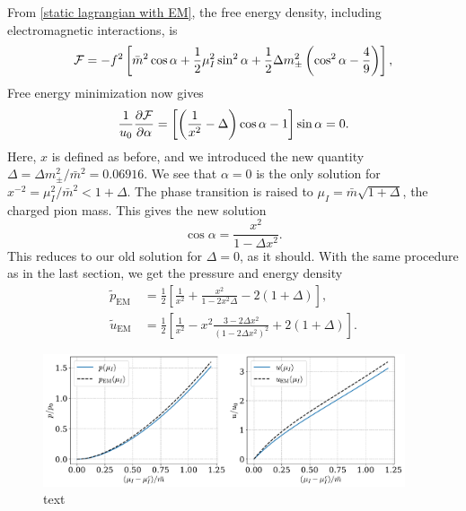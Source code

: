 From \autoref{static lagrangian with EM}, the free energy density, including electromagnetic interactions, is
%
\begin{equation}
    \mathcal{F} =
    - f^2 \left[
        \bar m^2 \cos \alpha 
        + \frac{1}{2} \mu_I^2 \sin^2 \alpha
        + \frac{1}{2} \Delta m_\pm^2 \left(\cos^2 \alpha - \frac{4}{9}\right)
    \right],
\end{equation}
%
Free energy minimization now gives
%
\begin{equation}
    \frac{1}{u_0}\pdv{\mathcal{F}}{\alpha}
    = 
    \left[ \left( \frac{1}{x^2} - \Delta \right) \cos \alpha - 1\right] \sin \alpha = 0.
\end{equation}
%
Here, $x$ is defined as before, and we introduced the new quantity $\Delta = \Delta m_{\pm}^2 / \bar m^2= 0.06916 $.
We see that $\alpha = 0$ is the only solution for $x^{-2} = \mu_I^2 / \bar m^2 < 1 + \Delta$.
The phase transition is raised to $\mu_I = \bar m \sqrt{1 + \Delta}$, the charged pion mass.
This gives the new solution
%
\begin{equation}
    \cos \alpha = \frac{x^2}{1 - \Delta x^2}.
\end{equation}
%
This reduces to our old solution for $\Delta = 0$, as it should.
With the same procedure as in the last section, we get the pressure and energy density
%
\begin{align}
    \tilde p_\text{EM} \
    & = \frac{1}{2} 
    \left[
        \frac{1}{x^2} 
        + \frac{x^2}{1 - 2x^2 \Delta} 
        - 2(1 + \Delta)
    \right], \\
    \tilde u_\text{EM}
    &= \frac{1}{2} 
    \left[
        \frac{1}{x^2} 
        - x^2 \frac{3 - 2 \Delta x^2}{(1 - 2 \Delta x^2)^2}
        + 2(1 + \Delta)
    \right].
\end{align}
%

\begin{figure}[!htb]
    \centering
    \includegraphics[width=0.95\textwidth]{../scripts/figurer/pion_star/pion_up.pdf}
    \caption{text
        }
        \label{fig: pressure and energy with EM interaction}
\end{figure}




